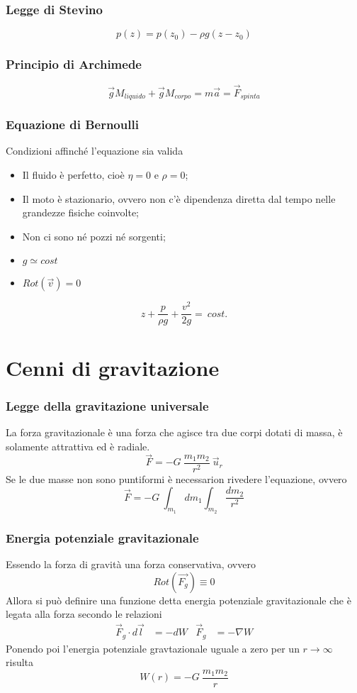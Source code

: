 \documentclass[12pt,a4paper]{report}
\begin{document}
	\subsection{Legge di Stevino}
		\[p(z)=p(z_{0})-\rho g(z-z_{0})\]
	\subsection{Principio di Archimede}
		\[\vec{g} M_{liquido} + \vec{g}M_{corpo} = m\vec{a}=\vec{F}_{spinta}\]
	\subsection{Equazione di Bernoulli}
Condizioni affinché l'equazione sia valida
\begin{itemize}
\item Il fluido è perfetto, cioè $\eta=0$ e $\rho=0$;
\item Il moto è stazionario, ovvero non c'è dipendenza diretta dal tempo nelle grandezze fisiche coinvolte;
\item Non ci sono né pozzi né sorgenti;
\item $g \simeq cost$ 
\item $Rot(\vec{v})=0$
\end{itemize}
		\[z+\frac{p}{\rho g} + \frac{v^{2}}{2g}= ~cost.\]
\chapter{Cenni di gravitazione}
	\subsection{Legge della gravitazione universale}
La forza gravitazionale è una forza che agisce tra due corpi dotati di massa, è solamente attrattiva ed è radiale.
		\[\vec{F	} = -G ~\frac{m_{1}m_{2}}{r^{2}} ~\vec{u}_{r}\]
Se le due masse non sono puntiformi è necessarion rivedere l'equazione, ovvero
		\[\vec{F	} = -G ~\int_{m_{1}} dm_{1} \int_{m_{2}} \frac{dm_{2}}{r^{2}}\]
	\subsection{Energia potenziale gravitazionale}
Essendo la forza di gravità una forza conservativa, ovvero
		\[Rot(\vec{F_{g}})\equiv 0\]
Allora si può definire una funzione detta energia potenziale gravitazionale che è legata alla forza secondo le relazioni
	\begin{align*}
		\vec{F}_{g} \cdot d\vec{l} &= -dW  & \vec{F}_{g} &= - \nabla W
	\end{align*}
Ponendo poi l'energia potenziale gravtazionale uguale a zero per un $r \rightarrow \infty $ risulta
		\[W(r)=-G~\frac{m_{1}m_{2}}{r}\] 
\end{document}
